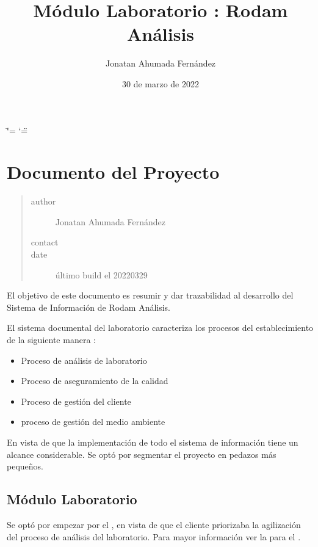 \documentclass[letterpaper,10pt,spanish]{sphinxmanual}
\title{Módulo Laboratorio : Rodam Análisis}
\date{30 de marzo de 2022}
\author{Jonatan Ahumada Fernández}
\begin{document}
\ifdefined\shorthandoff
  \ifnum\catcode`\=\string=\active\shorthandoff{=}\fi
  \ifnum\catcode`\"=\active{}\fi
\fi

\pagestyle{empty}
\sphinxmaketitle
\pagestyle{plain}
\sphinxtableofcontents
\pagestyle{normal}
\label{\detokenize{index::doc}}



\chapter{Documento del Proyecto}
\label{\detokenize{requerimientos/documento_proyecto:documento-del-proyecto}}\label{\detokenize{requerimientos/documento_proyecto::doc}}\begin{quote}\begin{description}
\item[{author}] \leavevmode
Jonatan Ahumada Fernández

\item[{contact}] \leavevmode
{}

\item[{date}] \leavevmode
último build el 2022\sphinxhyphen{}03\sphinxhyphen{}29

\end{description}\end{quote}

El objetivo de este documento es resumir y dar trazabilidad al
desarrollo del Sistema de Información de Rodam Análisis.

El sistema documental del laboratorio caracteriza los procesos del
establecimiento de la siguiente manera :
\begin{itemize}
\item {} 
Proceso de análisis de laboratorio

\item {} 
Proceso de aseguramiento de la calidad

\item {} 
Proceso de gestión del cliente

\item {} 
proceso de gestión del medio ambiente

\end{itemize}

En vista de que la implementación de todo el sistema de información tiene
un alcance considerable. Se optó por segmentar el proyecto en pedazos más
pequeños.


\section{Módulo Laboratorio}
\label{\detokenize{requerimientos/documento_proyecto:modulo-laboratorio}}
Se optó por empezar por el , en vista de que el cliente
priorizaba  la agilización del proceso de análisis del laboratorio. Para mayor
información ver la  para el .
\end{document}
